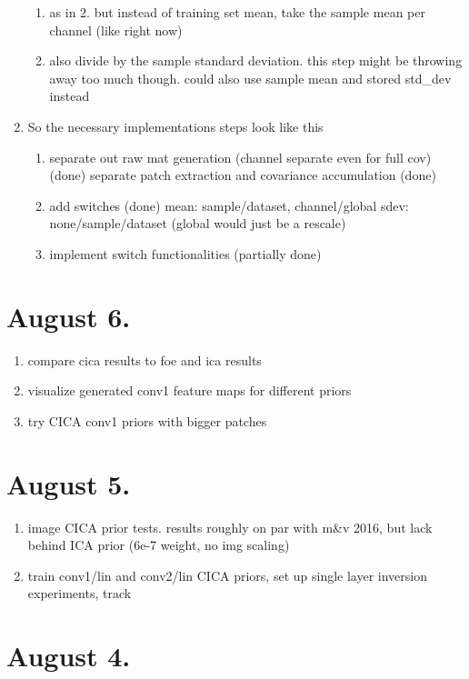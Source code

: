 \documentclass{article}
\begin{document}
\begin{enumerate}
\begin{enumerate}
		\item as in 2. but instead of training set mean, take the sample mean per channel (like right now)
		\item also divide by the sample standard deviation. this step might be throwing away too much though. could also use sample mean and stored std\_dev instead
	\end{enumerate}
	\item So the necessary implementations steps look like this
	\begin{enumerate}
		\item separate out raw mat generation (channel separate even for full cov) (done)
		separate patch extraction and covariance accumulation (done)
		\item add switches (done)
		mean: sample/dataset, channel/global
		sdev: none/sample/dataset (global would just be a rescale)
		\item implement switch functionalities (partially done)
	\end{enumerate}
\end{enumerate}


\section*{August 6.}

\begin{enumerate}
	\item compare cica results to foe and ica results
	\item visualize generated conv1 feature maps for different priors
	\item try CICA conv1 priors with bigger patches
\end{enumerate}

\section*{August 5.}

\begin{enumerate}
	\item image CICA prior tests. results roughly on par with m\&v 2016, but lack behind ICA prior (6e-7 weight, no img scaling)
	\item train conv1/lin and conv2/lin CICA priors, set up single layer inversion experiments, track
\end{enumerate}

\section*{August 4.}
\end{document}
